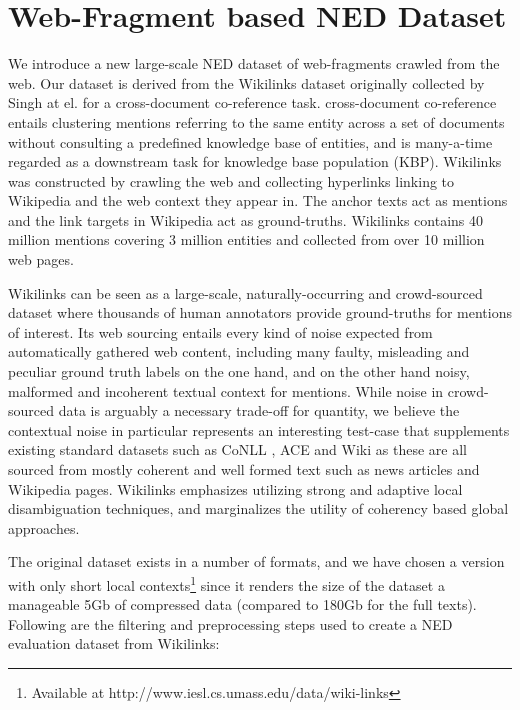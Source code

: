 \documentclass[11pt]{article}
\begin{document}
\section{\label{sec:w} Web-Fragment based NED Dataset}
We introduce a new large-scale NED dataset of web-fragments crawled from the web. Our dataset is derived from the Wikilinks dataset originally collected by Singh at el.  for a cross-document co-reference task. cross-document co-reference entails clustering mentions referring to the same entity across a set of documents without consulting a predefined knowledge base of entities, and is many-a-time regarded as a downstream task for knowledge base population (KBP). Wikilinks was constructed by crawling the web and collecting hyperlinks linking to Wikipedia and the web context they appear in. The anchor texts act as mentions and the link targets in Wikipedia act as ground-truths. Wikilinks contains 40 million mentions covering 3 million entities and collected from over 10 million web pages.

Wikilinks can be seen as a large-scale, naturally-occurring and crowd-sourced dataset where thousands of human annotators provide ground-truths for mentions of interest. Its web sourcing entails every kind of noise expected from automatically gathered web content, including many faulty, misleading and peculiar ground truth labels on the one hand, and on the other hand noisy, malformed and incoherent textual context for mentions. While noise in crowd-sourced data is arguably a necessary trade-off for quantity, we believe the contextual noise in particular represents an interesting test-case that supplements existing standard datasets such as CoNLL \cite{hoffart2011robust}, ACE and Wiki \cite{ratinov2011local} as these are all sourced from mostly coherent and well formed text such as news articles and Wikipedia pages. Wikilinks emphasizes utilizing strong and adaptive local disambiguation techniques, and marginalizes the utility of coherency based global approaches.

The original dataset exists in a number of formats, and we have chosen a version with only short local contexts\footnote{Available at http://www.iesl.cs.umass.edu/data/wiki-links} since it renders the size of the dataset a manageable 5Gb of compressed data (compared to 180Gb for the full texts). Following are the filtering and preprocessing steps used to create a NED evaluation dataset from Wikilinks:
\end{document}
